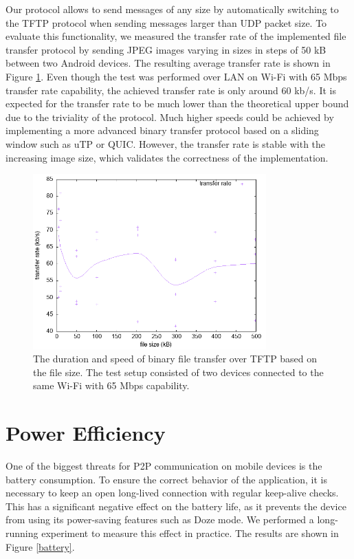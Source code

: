 Our protocol allows to send messages of any size by automatically switching to the TFTP protocol when sending messages larger than UDP packet size.
To evaluate this functionality, we measured the transfer rate of the implemented file transfer protocol by sending JPEG images varying in sizes in steps of 50 kB between two Android devices. The resulting average transfer rate is shown in Figure \ref{tftp_plot}. Even though the test was performed over LAN on Wi-Fi with 65 Mbps transfer rate capability, the achieved transfer rate is only around 60 kb/s. It is expected for the transfer rate to be much lower than the theoretical upper bound due to the triviality of the protocol. Much higher speeds could be achieved by implementing a more advanced binary transfer protocol based on a sliding window such as uTP or QUIC. However, the transfer rate is stable with the increasing image size, which validates the correctness of the implementation.

\begin{figure}[h!]
    \centering
    \includegraphics[width=0.8\textwidth]{plots/tftp}
    \caption{The duration and speed of binary file transfer over TFTP based on the file size. The test setup consisted of two devices connected to the same Wi-Fi with 65 Mbps capability.}
    \label{tftp_plot}
\end{figure}


\section{Power Efficiency}

One of the biggest threats for P2P communication on mobile devices is the battery consumption. To ensure the correct behavior of the application, it is necessary to keep an open long-lived connection with regular keep-alive checks. This has a significant negative effect on the battery life, as it prevents the device from using its power-saving features such as Doze mode. We performed a long-running experiment to measure this effect in practice. The results are shown in Figure \ref{battery}.

